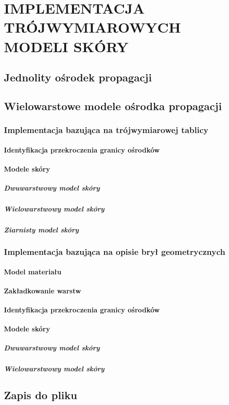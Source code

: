 \chapter{IMPLEMENTACJA TRÓJWYMIAROWYCH MODELI SKÓRY}
\label{chpt:implementacja-trójwymiarowych-modeli-skóry}
\section{Jednolity ośrodek propagacji}
\section{Wielowarstowe modele ośrodka propagacji}
\subsection{Implementacja bazująca na trójwymiarowej tablicy}
\subsubsection{Identyfikacja przekroczenia granicy ośrodków}
\subsubsection{Modele skóry}
\paragraph{Dwuwarstwowy model skóry}
\paragraph{Wielowarstwowy model skóry}
\paragraph{Ziarnisty model skóry}
\subsection{Implementacja bazująca na opisie brył geometrycznych}
\subsubsection{Model materiału}
\subsubsection{Zakładkowanie warstw}
\subsubsection{Identyfikacja przekroczenia granicy ośrodków}
\subsubsection{Modele skóry}
\paragraph{Dwuwarstwowy model skóry}
\paragraph{Wielowarstwowy model skóry}
\section{Zapis do pliku}
